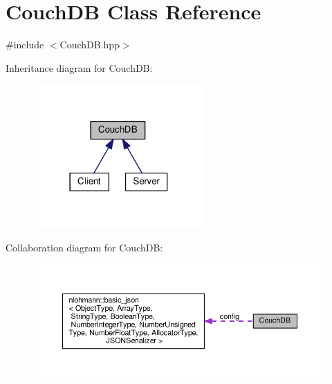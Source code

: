 \hypertarget{class_couch_d_b}{}\section{Couch\+DB Class Reference}
\label{class_couch_d_b}


{\ttfamily \#include $<$Couch\+D\+B.\+hpp$>$}



Inheritance diagram for Couch\+DB\+:\nopagebreak
\begin{figure}[H]
\begin{center}
\leavevmode
\includegraphics[width=186pt]{class_couch_d_b__inherit__graph}
\end{center}
\end{figure}


Collaboration diagram for Couch\+DB\+:\nopagebreak
\begin{figure}[H]
\begin{center}
\leavevmode
\includegraphics[width=350pt]{class_couch_d_b__coll__graph}
\end{center}
\end{figure}
